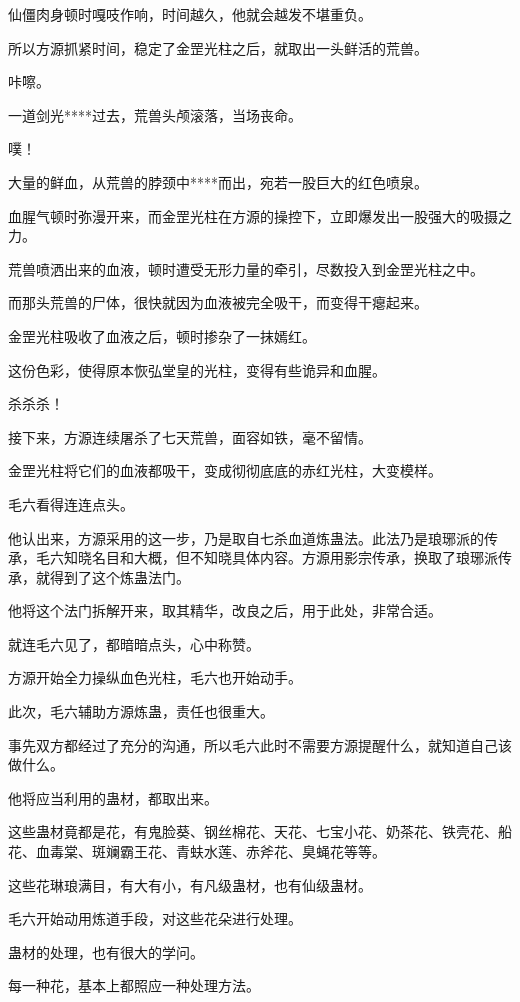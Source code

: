 \begin{this_body}
仙僵肉身顿时嘎吱作响，时间越久，他就会越发不堪重负。

所以方源抓紧时间，稳定了金罡光柱之后，就取出一头鲜活的荒兽。

咔嚓。

一道剑光****过去，荒兽头颅滚落，当场丧命。

噗！

大量的鲜血，从荒兽的脖颈中****而出，宛若一股巨大的红色喷泉。

血腥气顿时弥漫开来，而金罡光柱在方源的操控下，立即爆发出一股强大的吸摄之力。

荒兽喷洒出来的血液，顿时遭受无形力量的牵引，尽数投入到金罡光柱之中。

而那头荒兽的尸体，很快就因为血液被完全吸干，而变得干瘪起来。

金罡光柱吸收了血液之后，顿时掺杂了一抹嫣红。

这份色彩，使得原本恢弘堂皇的光柱，变得有些诡异和血腥。

杀杀杀！

接下来，方源连续屠杀了七天荒兽，面容如铁，毫不留情。

金罡光柱将它们的血液都吸干，变成彻彻底底的赤红光柱，大变模样。

毛六看得连连点头。

他认出来，方源采用的这一步，乃是取自七杀血道炼蛊法。此法乃是琅琊派的传承，毛六知晓名目和大概，但不知晓具体内容。方源用影宗传承，换取了琅琊派传承，就得到了这个炼蛊法门。

他将这个法门拆解开来，取其精华，改良之后，用于此处，非常合适。

就连毛六见了，都暗暗点头，心中称赞。

方源开始全力操纵血色光柱，毛六也开始动手。

此次，毛六辅助方源炼蛊，责任也很重大。

事先双方都经过了充分的沟通，所以毛六此时不需要方源提醒什么，就知道自己该做什么。

他将应当利用的蛊材，都取出来。

这些蛊材竟都是花，有鬼脸葵、钢丝棉花、天花、七宝小花、奶茶花、铁壳花、船花、血毒棠、斑斓霸王花、青蚨水莲、赤斧花、臭蝇花等等。

这些花琳琅满目，有大有小，有凡级蛊材，也有仙级蛊材。

毛六开始动用炼道手段，对这些花朵进行处理。

蛊材的处理，也有很大的学问。

每一种花，基本上都照应一种处理方法。


\end{this_body}

